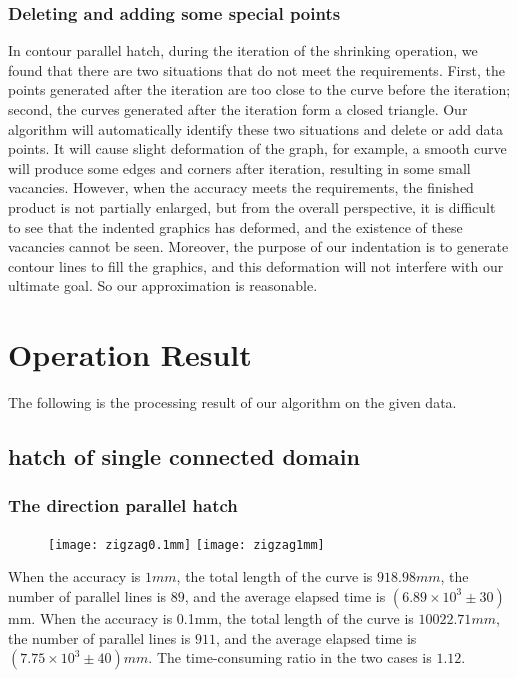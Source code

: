 \documentclass{apmcmthesis}
\begin{document}
\subsubsection{Deleting and adding some special points}
In contour parallel hatch, during the iteration of the shrinking operation, we found that there are two situations that do not meet the requirements. First, the points generated after the iteration are too close to the curve before the iteration; second, the curves generated after the iteration form a closed triangle. Our algorithm will automatically identify these two situations and delete or add data points. It will cause slight deformation of the graph, for example, a smooth curve will produce some edges and corners after iteration, resulting in some small vacancies. However, when the accuracy meets the requirements, the finished product is not partially enlarged, but from the overall perspective, it is difficult to see that the indented graphics has deformed, and the existence of these vacancies cannot be seen. Moreover, the purpose of our indentation is to generate contour lines to fill the graphics, and this deformation will not interfere with our ultimate goal. So our approximation is reasonable.




\section{Operation Result}
The following is the processing result of our algorithm on the given data.

\subsection{hatch of single connected domain}


\subsubsection{The direction parallel hatch}


\begin{figure}[!ht]
  \centering
  \texttt{[image: zigzag0.1mm]} \quad \texttt{[image: zigzag1mm]}
  \caption{}
  \caption{}
\end{figure}

When the accuracy is $1mm$, the total length of the curve is $918.98mm$, the number of parallel lines is $89$, and the average elapsed time is $(6.89\times 10^3\pm 30)$ mm. When the accuracy is 0.1mm, the total length of the curve is $10022.71mm$, the number of parallel lines is $911$, and the average elapsed time is $(7.75\times 10^3\pm 40) mm$. The time-consuming ratio in the two cases is $1.12$.
\end{document}
